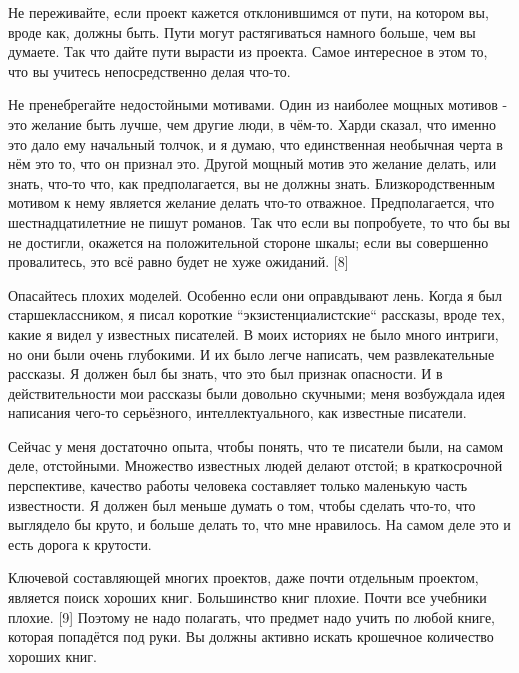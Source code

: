\documentclass[ebook,12pt,oneside,openany]{memoir}
\begin{document}
Не переживайте, если проект кажется отклонившимся от пути, на котором
вы, вроде как, должны быть. Пути могут растягиваться намного больше,
чем вы думаете. Так что дайте пути вырасти из проекта. Самое
интересное в этом то, что вы учитесь непосредственно делая что-то. \newline

Не пренебрегайте недостойными мотивами. Один из наиболее мощных
мотивов - это желание быть лучше, чем другие люди, в чём-то. Харди
сказал, что именно это дало ему начальный толчок, и я думаю, что
единственная необычная черта в нём это то, что он признал это. Другой
мощный мотив это желание делать, или знать, что-то что, как
предполагается, вы не должны знать. Близкородственным мотивом к нему
является желание делать что-то отважное. Предполагается, что
шестнадцатилетние не пишут романов. Так что если вы попробуете, то что
бы вы не достигли, окажется на положительной стороне шкалы; если вы
совершенно провалитесь, это всё равно будет не хуже ожиданий. [8] \newline

Опасайтесь плохих моделей. Особенно если они оправдывают лень. Когда я
был старшеклассником, я писал короткие ``экзистенциалистские`` рассказы,
вроде тех, какие я видел у известных писателей. В моих историях не
было много интриги, но они были очень глубокими. И их было легче
написать, чем развлекательные рассказы. Я должен был бы знать, что это
был признак опасности. И в действительности мои рассказы были довольно
скучными; меня возбуждала идея написания чего-то серьёзного,
интеллектуального, как известные писатели. \newline

Сейчас у меня достаточно опыта, чтобы понять, что те писатели были, на
самом деле, отстойными. Множество известных людей делают отстой; в
краткосрочной перспективе, качество работы человека составляет только
маленькую часть известности. Я должен был меньше думать о том, чтобы
сделать что-то, что выглядело бы круто, и больше делать то, что мне
нравилось. На самом деле это и есть дорога к крутости. \newline

Ключевой составляющей многих проектов, даже почти отдельным проектом,
является поиск хороших книг. Большинство книг плохие. Почти все
учебники плохие. [9] Поэтому не надо полагать, что предмет надо учить
по любой книге, которая попадётся под руки. Вы должны активно искать
крошечное количество хороших книг. \newline
\end{document}
